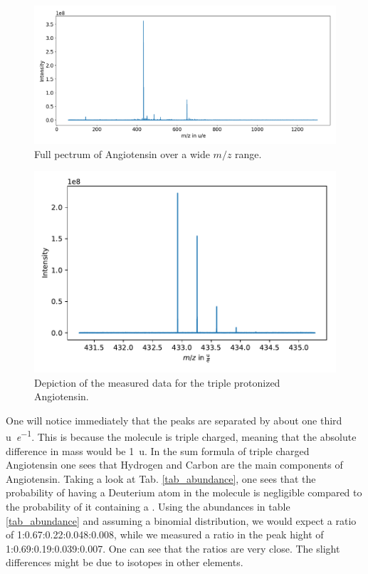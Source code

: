 \documentclass[a4paper,10pt]{article}
\begin{document}
\begin{figure}
  \centering
  \includegraphics[width = \textwidth]{humblespectrum.png}
  \caption{Full pectrum of Angiotensin over a wide $m/z$ range. }
  \label{fullspectrum}
\end{figure}

\begin{figure}[H]
	\centering
	\includegraphics[width = 0.8 \textwidth]{hires_spectrum.pdf}
	\caption{Depiction of the measured data for the triple protonized Angiotensin. }
	\label{fig_hres_spectroscopy}
\end{figure}

One will notice immediately that the peaks are separated by about one third \si{\atomicmassunit \per \elementarycharge}. This is because the molecule is triple charged, meaning that the absolute difference in mass would be \SI{1}{\atomicmassunit}. In the sum formula of triple charged Angiotensin  one sees that Hydrogen and Carbon are the main components of Angiotensin. Taking a look at Tab. \ref{tab_abundance}, one sees that the probability of having a Deuterium atom in the molecule is negligible compared to the probability of it containing a . Using the abundances in table \ref{tab_abundance} and assuming a binomial distribution, we would expect a ratio of 1:0.67:0.22:0.048:0.008, while we measured a ratio in the peak hight of 1:0.69:0.19:0.039:0.007. One can see that the ratios are very close. The slight differences might be due to isotopes in other elements.
\end{document}
